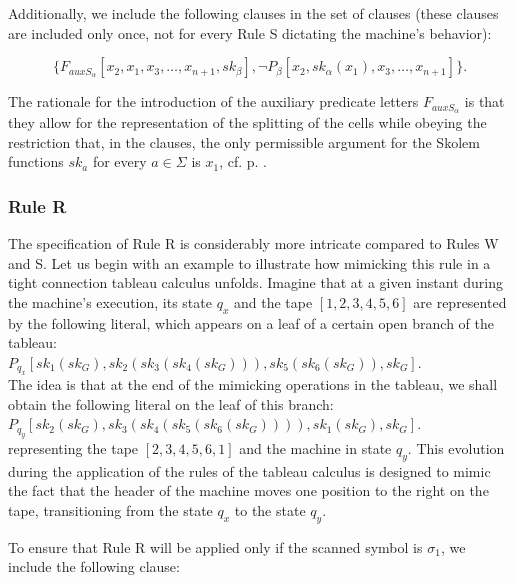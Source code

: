 \documentclass[%
  manuscript=article,   %
  year=2024,
  volume=77,
  doi=00000.000,
]{zfn}
\begin{document}
Additionally, we include the following clauses in the set of clauses (these clauses are included only once, not for every Rule S dictating the machine's behavior):

\begin{equation}
 \{F_{auxS_{\alpha}}[x_2, x_1, x_3, \ldots, x_{n+1}, sk_\beta], \neg P_\beta[x_2, sk_\alpha(x_1), x_3, \ldots, x_{n+1}]\}.
\end{equation}

The rationale for the introduction of the auxiliary predicate letters $F_{auxS_{\alpha}}$ is that they allow for the representation of the splitting of the cells while obeying the restriction that, in the clauses, the only permissible argument for the Skolem functions $sk_a$ for every $a \in \Sigma$ is $x_1$, cf. p. \pageref{x1rest}.

\subsubsection{Rule R}

The specification of Rule R is considerably more intricate compared to Rules W and S. Let us begin with an example to illustrate how mimicking this rule in a tight connection tableau calculus unfolds. Imagine that at a given instant during the machine's execution, its state $q_x$ and the tape $[1,2,3,4,5,6]$ are represented by the following literal, which appears on a leaf of a certain open branch of the tableau:\\

$P_{q_x}[sk_1(sk_G), sk_2(sk_3(sk_4(sk_G))), sk_5(sk_6(sk_G)), sk_G].$\\

The idea is that at the end of the mimicking operations in the tableau, we shall obtain the following literal on the leaf of this branch:\\

$P_{q_y}[sk_2(sk_G), sk_3(sk_4(sk_5(sk_6(sk_G)))), sk_1(sk_G), sk_G].$\\

\noindent representing the tape $[2,3,4,5,6,1]$ and the machine in state $q_y$. This evolution during the application of the rules of the tableau calculus is designed to mimic the fact that the header of the machine moves one position to the right on the tape, transitioning from the state $q_x$ to the state $q_y$.

To ensure that Rule R will be applied only if the scanned symbol is $\sigma_1$, we include the following clause:
\end{document}
